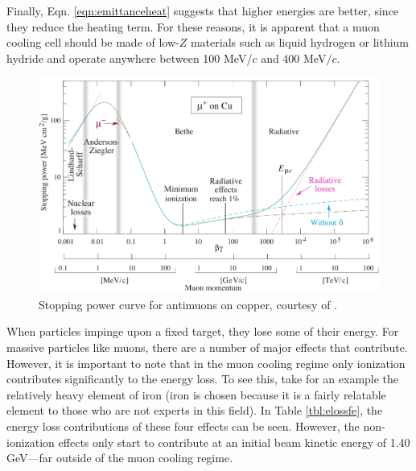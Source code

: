 \fi
Finally, Eqn. \ref{eqn:emittanceheat} suggests that higher energies are better, since they reduce the heating term. For these reasons, it is apparent that a muon cooling cell should be made of low-$Z$ materials such as liquid hydrogen or lithium hydride and operate anywhere between 100 MeV/$c$ and 400 MeV$/c$.

\begin{figure}
  \centering
    \includegraphics[width=\textwidth]{Figures/bethecurve} 
  \caption{Stopping power curve for antimuons on copper, courtesy of \cite{PDG}. }
  \label{fig:bethecurve}
\end{figure}

When particles impinge upon a fixed target, they lose some of their energy. For massive particles like muons, there are a number of major effects that contribute. However, it is important to note that in the muon cooling regime only ionization contributes significantly to the energy loss. To see this, take for an example the relatively heavy element of iron (iron is chosen because it is a fairly relatable element to those who are not experts in this field). In Table \ref{tbl:elossfe}, the energy loss contributions of these four effects can be seen. However, the non-ionization effects only start to contribute at an initial beam kinetic energy of 1.40 GeV---far outside of the muon cooling regime.

